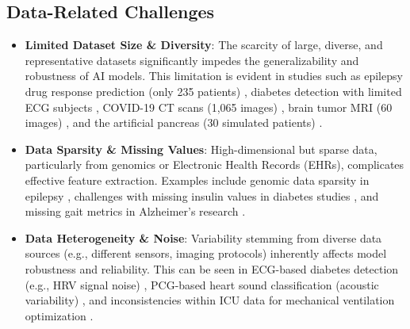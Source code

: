 \documentclass[runningheads]{llncs}
\begin{document}
\subsection{Data-Related Challenges}
\begin{itemize}
    \item \textbf{Limited Dataset Size \& Diversity}: The scarcity of large, diverse, and representative datasets significantly impedes the generalizability and robustness of AI models. This limitation is evident in studies such as epilepsy drug response prediction (only 235 patients) \cite{article_1}, diabetes detection with limited ECG subjects \cite{article_4}, COVID-19 CT scans (1,065 images) \cite{article_20}, brain tumor MRI (60 images) \cite{article_12}, and the artificial pancreas (30 simulated patients) \cite{article_22}.
    \item \textbf{Data Sparsity \& Missing Values}: High-dimensional but sparse data, particularly from genomics or Electronic Health Records (EHRs), complicates effective feature extraction. Examples include genomic data sparsity in epilepsy \cite{article_1}, challenges with missing insulin values in diabetes studies \cite{article_2}, and missing gait metrics in Alzheimer's research \cite{article_3}.
    \item \textbf{Data Heterogeneity \& Noise}: Variability stemming from diverse data sources (e.g., different sensors, imaging protocols) inherently affects model robustness and reliability. This can be seen in ECG-based diabetes detection (e.g., HRV signal noise) \cite{article_4}, PCG-based heart sound classification (acoustic variability) \cite{article_6}, and inconsistencies within ICU data for mechanical ventilation optimization \cite{article_24}.
\end{itemize}
\end{document}
